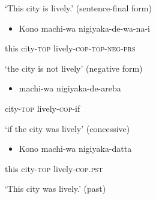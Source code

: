 \documentclass[output=paper]{langscibook}
\begin{document}
\begin{styleBeispielCinqueKapitel}
‘This city is lively.’     (sentence-final form)
\end{styleBeispielCinqueKapitel}

\begin{itemize}
\item \begin{styleBeispielCinqueKapitel}
Kono machi-wa nigiyaka{}-de-wa-na-i
\end{styleBeispielCinqueKapitel}
\end{itemize}
\begin{styleBeispielCinqueKapitel}
this city-\textsc{top} lively-\textsc{cop-top-neg-prs}
\end{styleBeispielCinqueKapitel}

\begin{styleBeispielCinqueKapitel}
‘the city is not lively’     (negative form)
\end{styleBeispielCinqueKapitel}

\begin{itemize}
\item \begin{styleBeispielCinqueKapitel}
machi-wa nigiyaka-de-areba
\end{styleBeispielCinqueKapitel}
\end{itemize}
\begin{styleBeispielCinqueKapitel}
city-\textsc{top} lively-\textsc{cop}{}-if 
\end{styleBeispielCinqueKapitel}

\begin{styleBeispielCinqueKapitel}
‘if the city was lively’     (concessive)
\end{styleBeispielCinqueKapitel}

\begin{itemize}
\item \begin{styleBeispielCinqueKapitel}
Kono machi-wa nigiyaka-datta 
\end{styleBeispielCinqueKapitel}
\end{itemize}
\begin{styleBeispielCinqueKapitel}
this city-\textsc{top} lively-\textsc{cop.pst} 
\end{styleBeispielCinqueKapitel}

\begin{styleBeispielCinqueKapitel}
‘This city was lively.’     (past)
\end{styleBeispielCinqueKapitel}
\end{document}
